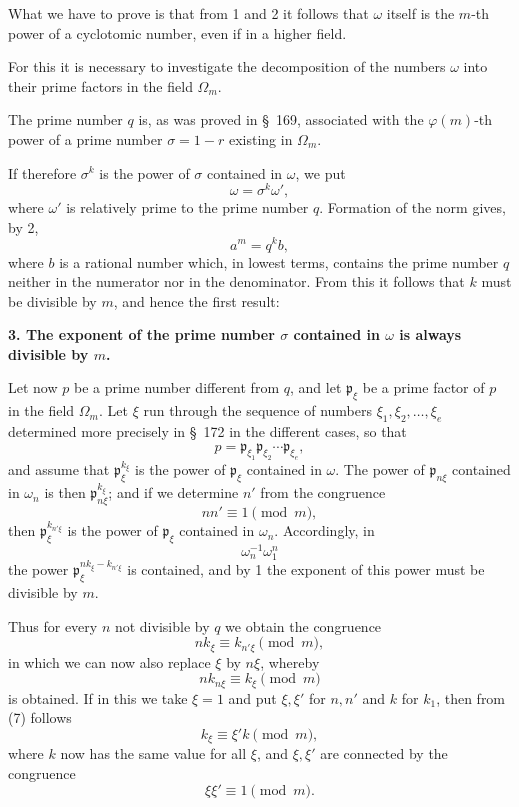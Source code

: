 \documentclass[11pt]{article}
\newcommand{\pp}{\mathfrak p}
\begin{document}
What we have to prove is that from 1 and 2 it follows that $\omega$ itself is the $m$-th power of a cyclotomic number, even if in a higher field.

For this it is necessary to investigate the decomposition of the numbers $\omega$ into their prime factors in the field $\Omega_m$.

The prime number $q$ is, as was proved in \S~169, associated with the $\varphi(m)$-th power of a prime number $\sigma=1-r$ existing in $\Omega_m$.

If therefore $\sigma^k$ is the power of $\sigma$ contained in $\omega$, we put
\[
  \omega=\sigma^k\omega',
\]
where $\omega'$ is relatively prime to the prime number $q$. Formation of the norm gives, by 2,
\[
  a^m=q^k b,
\]
where $b$ is a rational number which, in lowest terms, contains the prime number $q$ neither in the numerator nor in the denominator. From this it follows that $k$ must be divisible by $m$, and hence the first result:

\textbf{3. The exponent of the prime number $\sigma$ contained in $\omega$ is always divisible by $m$.}

Let now $p$ be a prime number different from $q$, and let $\pp_\xi$ be a prime factor of $p$ in the field $\Omega_m$. Let $\xi$ run through the sequence of numbers $\xi_1,\xi_2,\ldots,\xi_e$ determined more precisely in \S~172 in the different cases, so that
\begin{equation}
  p=\pp_{\xi_1}\pp_{\xi_2}\cdots\pp_{\xi_e},
\tag{3}
\end{equation}
and assume that $\pp_\xi^{k_\xi}$ is the power of $\pp_\xi$ contained in $\omega$. The power of $\pp_{n\xi}$ contained in $\omega_n$ is then $\pp_{n\xi}^{k_\xi}$; and if we determine $n'$ from the congruence
\begin{equation}
  nn'\equiv 1\pmod m,
\tag{4}
\end{equation}
then $\pp_\xi^{k_{n'\xi}}$ is the power of $\pp_\xi$ contained in $\omega_n$. Accordingly, in
\begin{equation}
  \omega_n^{-1}\omega_1^n
\tag{5}
\end{equation}
the power $\pp_\xi^{n k_\xi-k_{n'\xi}}$ is contained, and by 1 the exponent of this power must be divisible by $m$.

Thus for every $n$ not divisible by $q$ we obtain the congruence
\begin{equation}
  n k_\xi\equiv k_{n'\xi}\pmod m,
\tag{6}
\end{equation}
in which we can now also replace $\xi$ by $n\xi$, whereby
\begin{equation}
  n k_{n\xi}\equiv k_\xi\pmod m
\tag{7}
\end{equation}
is obtained. If in this we take $\xi=1$ and put $\xi,\xi'$ for $n,n'$ and $k$ for $k_1$, then from (7) follows
\begin{equation}
  k_\xi\equiv \xi' k\pmod m,
\tag{8}
\end{equation}
where $k$ now has the same value for all $\xi$, and $\xi,\xi'$ are connected by the congruence
\[
  \xi\xi'\equiv1\pmod m.
\]
\end{document}
